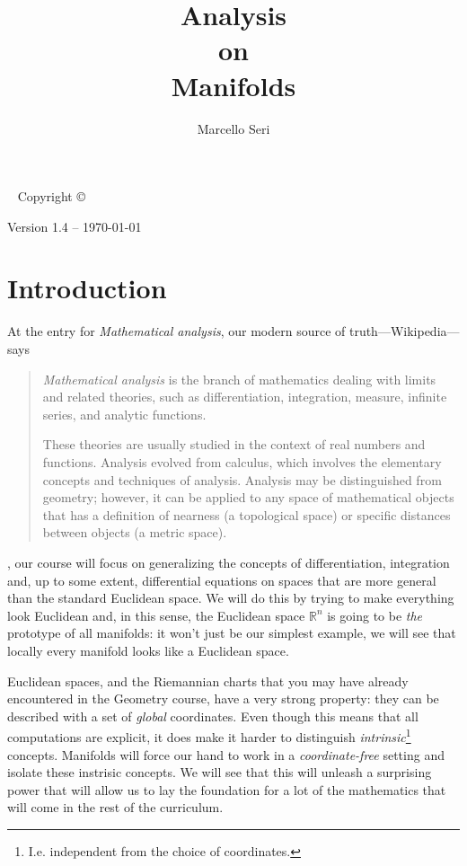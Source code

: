 \documentclass[nobib, a4paper]{tufte-book}
\title{Analysis\\ \noindent
  on\\ \noindent
  Manifolds
}
\author{Marcello Seri}
\theoremstyle{plain}
\theoremstyle{definition}
\theoremstyle{remark}
\newcommand{\R}{\mathbb{R}}
\begin{document}
\maketitlepage

\newpage

\begin{fullwidth}
  ~\vfill
  \thispagestyle{empty}
  \setlength{\parindent}{0pt}
  \setlength{\parskip}{\baselineskip}
  Copyright \copyright\ \the\year\ \thanklessauthor

  \par Version 1.4 -- \today

  \vfill
  \small{\doclicenseThis}
\end{fullwidth}

\tableofcontents
\cleardoublepage

\chapter*{Introduction}

At the entry for \emph{Mathematical analysis}, our modern source of truth---Wikipedia---says

\begin{quotation}
  \emph{Mathematical analysis} is the branch of mathematics dealing with limits and related theories, such as differentiation, integration, measure, infinite series, and analytic functions.

  These theories are usually studied in the context of real numbers and functions. Analysis evolved from calculus, which involves the elementary concepts and techniques of analysis. Analysis may be distinguished from geometry; however, it can be applied to any space of mathematical objects that has a definition of nearness (a topological space) or specific distances between objects (a metric space).
\end{quotation}

, our course will focus on generalizing the concepts of differentiation, integration and, up to some extent, differential equations on spaces that are more general than the standard Euclidean space.
We will do this by trying to make everything look Euclidean and, in this sense, the Euclidean space $\R^n$ is going to be \emph{the} prototype of all manifolds: it won't just be our simplest example, we will see that locally every manifold looks like a Euclidean space.

Euclidean spaces, and the Riemannian charts that you may have already encountered in the Geometry course, have a very strong property: they can be described with a set of \emph{global} coordinates.
Even though this means that all computations are explicit, it does make it harder to distinguish \emph{intrinsic}\footnote{I.e. independent from the choice of coordinates.} concepts.
Manifolds will force our hand to work in a \emph{coordinate-free} setting and isolate these instrisic concepts.
We will see that this will unleash a surprising power that will allow us to lay the foundation for a lot of the mathematics that will come in the rest of the curriculum.
\end{document}
